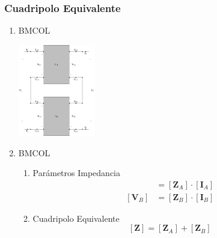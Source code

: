 \subsubsection{Cuadripolo Equivalente}
\label{sec:orga827299}
\begin{enumerate}
\item \hfill{}\textsc{BMCOL}
\label{sec:org213121f}
\begin{center}
\includegraphics[height=4cm]{../figs/serie-serie.pdf}
\end{center}


\item \hfill{}\textsc{BMCOL}
\label{sec:org38dbe81}
\begin{enumerate}
\item Parámetros Impedancia
\label{sec:orgb198b8f}
\begin{align*}
  [\mathbf{V}_A] &= [\mathbf{Z}_A] \cdot [\mathbf{I}_A]\\
  [\mathbf{V}_B] &= [\mathbf{Z}_B] \cdot [\mathbf{I}_B]
\end{align*}

\item Cuadripolo Equivalente
\label{sec:org2696460}
\[
  \boxed{[\mathbf{Z}] = [\mathbf{Z}_A] + [\mathbf{Z}_B]}
\]
\end{enumerate}
\end{enumerate}

